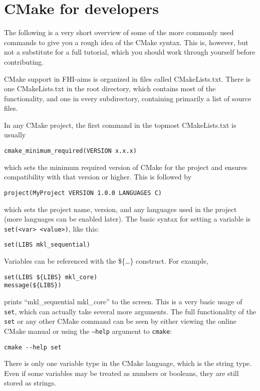 \section{CMake for developers}

The following is a very short overview of some of the more commonly used commands to give you a rough idea of the CMake syntax. This is, however, but not a substitute for a full tutorial, which you should work through yourself before contributing.

CMake support in FHI-aims is organized in files called CMakeLists.txt. There is one CMakeLists.txt in the root directory, which contains most of the functionality, and one in every subdirectory, containing primarily a list of source files.

In any CMake project, the first command in the topmost CMakeLists.txt is usually
\begin{verbatim}
cmake_minimum_required(VERSION x.x.x)
\end{verbatim}
which sets the minimum required version of CMake for the project and ensures compatibility with that version or higher. This is followed by
\begin{verbatim}
project(MyProject VERSION 1.0.0 LANGUAGES C)
\end{verbatim}
which sets the project name, version, and any languages used in the project (more languages can be enabled later). The basic syntax for setting a variable is \texttt{set(<var> <value>)}, like this:
\begin{verbatim}
set(LIBS mkl_sequential)
\end{verbatim}
Variables can be referenced with the \$\{\ldots\} construct. For example,
\begin{verbatim}
set(LIBS ${LIBS} mkl_core)
message(${LIBS})
\end{verbatim}
prints ``mkl\_sequential mkl\_core'' to the screen. This is a very basic usage of \texttt{set}, which can actually take several more arguments. The full functionality of the \texttt{set} or any other CMake command can be seen by either viewing the online CMake manual or using the \texttt{--help} argument to \texttt{cmake}:
\begin{verbatim}
cmake --help set
\end{verbatim}

There is only one variable type in the CMake language, which is the string type. Even if some variables may be treated as numbers or booleans, they are still stored as strings.

